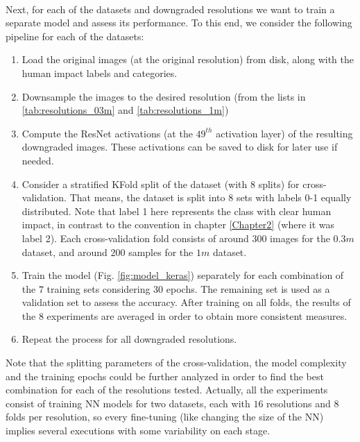 \

Next, for each of the datasets and downgraded resolutions we want to train a separate model and assess its performance. To this end, we consider the following pipeline for each of the datasets:

\begin{enumerate}
	\item Load the original images (at the original resolution) from disk, along with the human impact labels and categories.
	
	\item Downsample the images to the desired resolution (from the lists in \ref{tab:resolutions_03m} and \ref{tab:resolutions_1m})
	
	\item Compute the ResNet activations (at the $49^{th}$ activation layer) of the resulting downgraded images. These activations can be saved to disk for later use if needed.
	
	\item Consider a stratified KFold split of the dataset (with $8$ splits) for cross-validation. That means, the dataset is split into $8$ sets with labels 0-1 equally distributed. Note that label 1 here represents the class with clear human impact, in contrast to the convention in chapter \ref{Chapter2} (where it was label 2).  Each cross-validation fold consists of around $300$ images for the $0.3m$ dataset, and around $200$ samples for the $1m$ dataset.
	
	\item Train the model (Fig. \ref{fig:model_keras}) separately for each combination of the $7$ training sets considering 30 epochs. The remaining set is used as a validation set to assess the accuracy. After training on all folds, the results of the $8$ experiments are averaged in order to obtain more consistent measures.
	
	\item Repeat the process for all downgraded resolutions.
\end{enumerate}

Note that the splitting parameters of the cross-validation, the model complexity and the training epochs could be further analyzed in order to find the best combination for each of the resolutions tested. Actually, all the experiments consist of training NN models for two datasets, each with $16$ resolutions and $8$ folds per resolution, so every fine-tuning (like changing the size of the NN) implies several executions with some variability on each stage.

